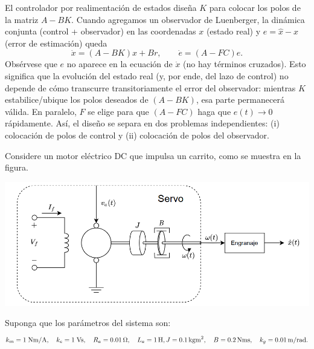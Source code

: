 \documentclass[
  11pt,
  letterpaper,
   addpoints,
   answers
  ]{exam}
\begin{document}
\begin{questions}
\begin{solution}
   El controlador por realimentación de estados diseña $K$ para colocar los polos de la matriz $A-BK$. Cuando agregamos un observador de Luenberger, la dinámica conjunta (control + observador) en las coordenadas $x$ (estado real) y $e = \hat x - x$ (error de estimación) queda
  \[
     \dot x = (A-BK)x + Br, \qquad \dot e = (A-FC)e.
  \]
  Obsérvese que $e$ no aparece en la ecuación de $\dot x$ (no hay términos cruzados). Esto significa que la evolución del estado real (y, por ende, del lazo de control) no depende de cómo transcurre transitoriamente el error del observador: mientras $K$ estabilice/ubique los polos deseados de $(A-BK)$, esa parte permanecerá válida. En paralelo, $F$ se elige para que $(A-FC)$ haga que $e(t)\to 0$ rápidamente. Así, el diseño se separa en dos problemas independientes: (i) colocación de polos de control y (ii) colocación de polos del observador.

  \end{solution}
  \question Considere un motor eléctrico DC que impulsa un carrito, como se muestra en la figura.
  \begin{center}
    \includegraphics[width=.75\textwidth]{../figures/Auxiliar_4_4.png}
  \end{center}
  Suponga que los parámetros del sistema son:
  \[
     k_m = 1\;\text{Nm/A},\quad k_e = 1\;\text{Vs},\quad R_a = 0.01\,\Omega,\quad L_a = 1\,\text{H},        \\
     J = 0.1\,\text{kgm}^2,\quad B = 0.2\,\text{Nms}, \quad k_g = 0.01\,\text{m/rad}.
  \]
\end{questions}
\end{document}
